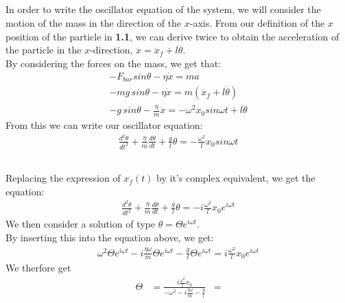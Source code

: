 \documentclass{article}
\begin{document}
\subsection{} %

In order to write the oscillator equation of the system, we will consider the motion of the mass in the direction of the $x$-axis. From our definition of the $x$ position of the particle in \textbf{1.1}, we can derive twice to obtain the acceleration of the particle in the $x$-direction, $\ddot{x} = \ddot{x}_f + l \ddot{\theta}$.\\

\noindent By considering the forces on the mass, we get that:
\begin{align*}
	-F_{bar}sin\theta - \eta \dot{x} = ma\\
	-mg\,sin\theta - \eta \dot{x} = m( \ddot{x}_f + l \ddot{\theta})\\
	-g\,sin\theta - \frac{\eta}{m} \dot{x} = -\omega^2x_0sin \omega t + l \ddot{\theta}
\end{align*}
From this we can write our oscillator equation:
\begin{align*}
	 \frac{d^2 \theta}{dt^2} + \frac{\eta}{m}\frac{d \theta}{dt} + \frac{g}{l}\theta  = -\frac{\omega^2}{l}x_0sin\omega t 
\end{align*}

\subsection{} %

Replacing the expression of $x_f(t)$ by it's complex equivalent, we get the equation:
\begin{align*}
	\frac{d^2 \theta}{dt^2} + \frac{\eta}{m}\frac{d \theta}{dt} + \frac{g}{l}\theta  = -i\frac{\omega^2}{l}x_0e^{i \omega t} 
\end{align*}
We then consider a solution of  type $\theta = \Theta e^{i \omega t}$.\\
By inserting this into the equation above, we get:
\begin{align*}
	\omega^2\Theta e^{i \omega t} - i\frac{\eta \omega}{m}\Theta e^{i \omega t} - \frac{g}{l}\Theta e^{i \omega t} = i\frac{\omega^2}{l}x_0e^{i \omega t}
\end{align*}
We therfore get
\begin{align*}
	\Theta &= \frac{i \frac{\omega^2}{l}x_0}{-\omega^2 - i\frac{\eta \omega}{m} - \frac{g}{l}}
	&=
\end{align*}
\subsection{} %
\end{document}
